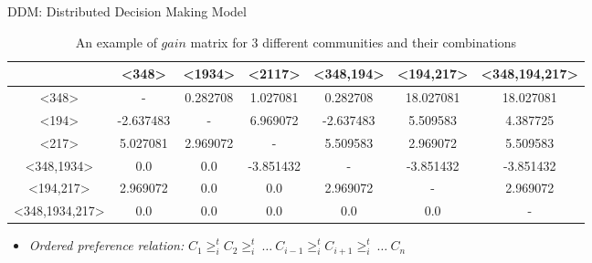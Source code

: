 \documentclass{beamer}
\begin{document}
\begin{frame}{DDM: Distributed Decision Making Model}
    \begin{table}[ht]
        \tiny
        \caption{An example of $gain$ matrix for 3 different communities and their combinations} %
        \centering %
        {\renewcommand{\arraystretch}{1.2}
        \begin{tabular}{c|c c c c c c} %
        \hline\hline %
         & \textless348\textgreater & \textless1934\textgreater & \textless2117\textgreater & \textless348,194\textgreater & \textless194,217\textgreater & \textless348,194,217\textgreater \\ [0.5ex] %
        \hline %
        \textless348\textgreater & - & 0.282708 & 1.027081 & 0.282708 & 18.027081 & 18.027081 \\
        \textless194\textgreater & -2.637483 & - & 6.969072 & -2.637483 & 5.509583 & 4.387725 \\
        \textless217\textgreater & 5.027081 & 2.969072 & - & 5.509583 & 2.969072 & 5.509583 \\
        \textless348,1934\textgreater & 0.0 & 0.0 & -3.851432 & - & -3.851432 & -3.851432 \\
        \textless194,217\textgreater & 2.969072 & 0.0 & 0.0 & 2.969072 & - & 2.969072 \\
        \textless348,1934,217\textgreater & 0.0 & 0.0 & 0.0 & 0.0 & 0.0 & - \\ [1ex] %
        \hline %
        \end{tabular}
        }
        \label{table:nonlin} %
    \end{table}

    \footnotesize
    \begin{itemize}
        \item \emph{Ordered preference relation:} $C_1 \geq_{i}^t C_2 \geq_{i}^t ~\dots~ C_{i-1} \geq_{i}^t C_{i+1} \geq_{i}^t ~\dots~ C_n$
    \end{itemize}

\end{frame}
\end{document}
